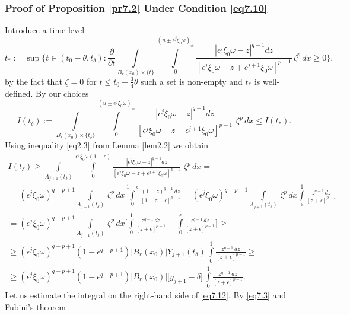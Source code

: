 \documentclass[a4paper,11pt,fullpage]{article}
\numberwithin{equation}{section}
\begin{document}
\subsubsection{Proof of Proposition \ref{pr7.2} Under Condition \eqref{eq7.10}}
Introduce a time level
$$t_*:=\sup\Big\{t\in (t_0-\theta, t_\delta): \frac{\partial}{\partial t}\int\limits_{B_r(x_0)\times\{t\}}\int\limits^{(u\pm\epsilon^j\xi_0\omega)_{\pm}}_0\frac{|\epsilon^j\xi_0\omega-z|^{q-1} dz}{[\epsilon^j\xi_0\omega-z+\epsilon^{j+1}\xi_0\omega]^{p-1}}\,
\zeta^p\,dx \geqslant 0 \Big\},$$
by the fact that $\zeta=0$ for $t\leqslant t_0-\frac{3}{4}\theta$ such a set is non-empty and $t_*$ is well-defined.  By our choices
\begin{equation}\label{eq7.12}
I(t_\delta):=\int\limits_{B_r(x_0)\times\{t_\delta\}}\int\limits^{(u\pm\epsilon^j\xi_0\omega)_{\pm}}_0\frac{|\epsilon^j\xi_0\omega-z|^{q-1} dz}{[\epsilon^j\xi_0\omega-z+\epsilon^{j+1}\xi_0\omega]^{p-1}}\,
\,\zeta^p\,dx\leqslant I(t_*).
\end{equation}
Using inequality \eqref{eq2.3} from Lemma \ref{lem2.2} we obtain
\begin{multline}\label{eq7.13}
I(t_\delta)\geqslant \int\limits_{A_{j+1}(t_\delta)}\int\limits^{\epsilon^j\xi_0\omega(1-\epsilon)}_0\frac{|\epsilon^j\xi_0\omega-z|^{q-1} dz}{[\epsilon^j\xi_0\omega-z+\epsilon^{j+1}\xi_0\omega]^{p-1}}\,
\,\zeta^p\,dx=\\=(\epsilon^j\xi_0\omega)^{q-p+1}\int\limits_{A_{j+1}(t_\delta)}
\,\zeta^p\,dx\int\limits^{1-\epsilon}_0\frac{(1-z)^{q-1}\,dz}{[1-z+\epsilon]^{p-1}}=
(\epsilon^j\xi_0\omega)^{q-p+1}\int\limits_{A_{j+1}(t_\delta)}
\,\zeta^p\,dx\int\limits^{1}_\epsilon \frac{z^{q-1}\,dz}{[z+\epsilon]^{p-1}}=\\=
(\epsilon^j\xi_0\omega)^{q-p+1}\int\limits_{A_{j+1}(t_\delta)}
\,\zeta^p\,dx\bigg[\int\limits^{1}_0 \frac{z^{q-1}\,dz}{[z+\epsilon]^{p-1}}-\int\limits^{\epsilon}_0 \frac{z^{q-1}\,dz}{[z+\epsilon]^{p-1}}\bigg]\geqslant\\\geqslant(\epsilon^j\xi_0\omega)^{q-p+1}(1-\epsilon^{q-p+1})|B_r(x_0)|Y_{j+1}(t_\delta)\,
\int\limits^{1}_0 \frac{z^{q-1}\,dz}{[z+\epsilon]^{p-1}}\geqslant\\\geqslant(\epsilon^j\xi_0\omega)^{q-p+1}(1-\epsilon^{q-p+1})|B_r(x_0)|\Big[y_{j+1}-\delta\Big]\,
\int\limits^{1}_0 \frac{z^{q-1}\,dz}{[z+\epsilon]^{p-1}}.
\end{multline}
Let us estimate the integral on the right-hand side of \eqref{eq7.12}. By \eqref{eq7.3} and Fubini's theorem
\end{document}
